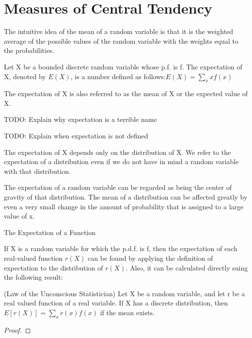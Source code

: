 \section{Measures of Central Tendency}
\label{sec:probability_expectation}

{\color{red} The intuitive idea of the mean of a random variable is that it is the weighted average of the possible values of the random variable with the weights equal to the probabilities.}

\begin{definition}
Let X be a bounded discrete random variable whose p.f. is f. The expectation of X, denoted by $E\left(X\right)$, is a number defined as follows:$E\left(X\right)=\sum_{x}xf\left(x\right)$
\end{definition}

{\color{red} The expectation of X is also referred to as the mean of X or the expected value of X.}

\begin{example}
{\color{red} TODO: Explain why expectation is a terrible name}
\end{example}

{\color{red} TODO: Explain when expectation is not defined}

{\color{red} The expectation of X depends only on the distribution of X. We refer to the expectation of a distribution even if we do not have in mind a random variable with that distribution.}

{\color{red} The expectation of a random variable can be regarded as being the center of gravity of that distribution. The mean of a distribution can be affected greatly by even a very small change in the amount of probability that is assigned to a large value of x.}

The Expectation of a Function

{\color{red} If X is a random variable for which the p.d.f. is f, then the expectation of each real-valued function $r\left(X\right)$ can be found by applying the definition of expectation to the distribution of $r\left(X\right)$. Also, it can be calculated directly suing the following result:}

\begin{proposition}
(Law of the Unconscious Statistician) Let X be a random variable, and let r be a real valued function of a real variable. If X has a discrete distribution, then $E\left[r\left(X\right)\right]=\sum_{x}r\left(x\right)f\left(x\right)$
if the mean exists.
\end{proposition}
\begin{proof}
\end{proof}

